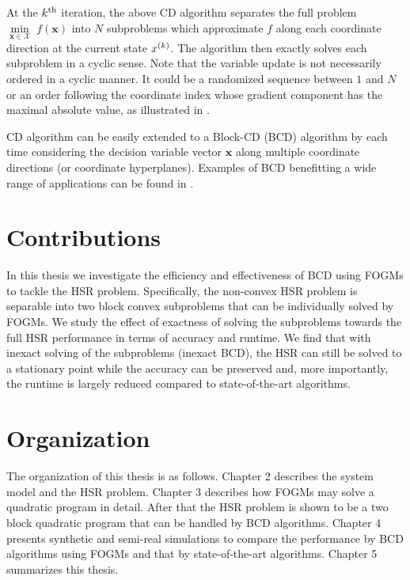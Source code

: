 At the $k^\text{th}$ iteration, the above CD algorithm separates the full problem
$\underset{\bm x\in\mathcal X}{\min}\;f(\bm x)$ into $N$ subproblems which
approximate $f$ along each coordinate direction at the current state
$x^{(k)}$.
The algorithm then exactly solves each subproblem in a cyclic sense.
Note that the variable update is not necessarily ordered in a cyclic manner.
It could be a randomized sequence between $1$ and $N$ or an order following
the coordinate index whose gradient component has the maximal absolute value,
as illustrated in
\cite{NESTEROV_BCD_HUGE_PROBLEM}.

CD algorithm can be easily extended to a Block-CD (BCD) algorithm by each time
considering the decision variable vector $\bm x$ along multiple coordinate
directions (or coordinate hyperplanes).
Examples of BCD benefitting a wide range of applications can be found in
\cite{BCD_APPL_STAT_TOMOGRAPHY,
      BCD_APPL_DIFF_TOMOGRAPHY,
      BCD_APPL_BCD_FOR_MULTITASK_LASSO_NEURAL_DISCOV,
      BCD_APPL_PROTEIN_LOOP,
      BCD_APPL_OD_MATRIX_ADJ_PROBL,
      BCD_APPL_BIOFEATURE,
      BCD_APPL_SPARSE_COV_EST,
      BCD_APPL_LARGESCALE_LINEAR_SVM}.

\section{Contributions}
In this thesis we investigate the efficiency and effectiveness of BCD using
FOGMs to tackle the HSR problem.
Specifically, the non-convex HSR problem is separable into two block convex
subproblems that can be individually solved by FOGMs.
We study the effect of exactness of solving the subproblems towards the full
HSR performance in terms of accuracy and runtime.
We find that with inexact solving of the subproblems (\ie inexact BCD), the
HSR can still be solved to a stationary point while the accuracy can be
preserved and, more importantly, the runtime is largely reduced compared to
state-of-the-art algorithms.

\section{Organization}
The organization of this thesis is as follows.
Chapter 2 describes the system model and the HSR problem.
Chapter 3 describes how FOGMs may solve a quadratic program in detail.
After that the HSR problem is shown to be a two block quadratic program that
can be handled by BCD algorithms.
Chapter 4 presents synthetic and semi-real simulations to compare the
performance by BCD algorithms using FOGMs and that by state-of-the-art
algorithms.
Chapter 5 summarizes this thesis.

